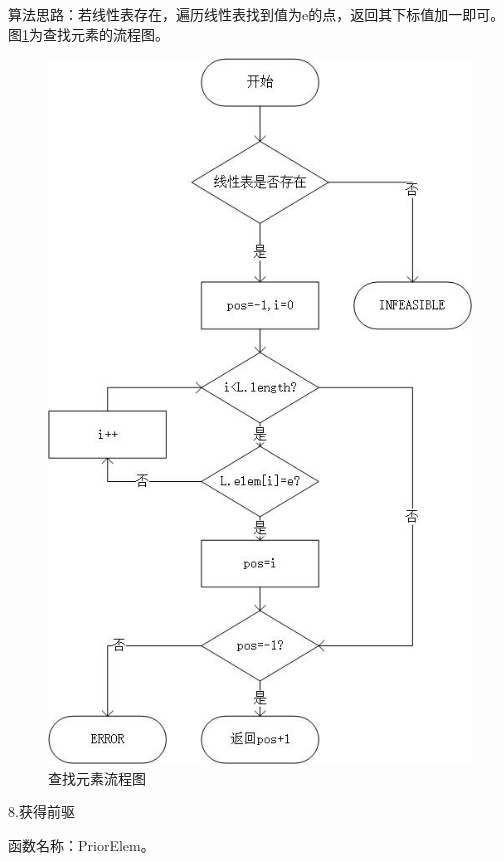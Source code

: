 \documentclass[supercite]{Experimental_Report}
\theoremstyle{definition}
\begin{document}
算法思路：若线性表存在，遍历线性表找到值为e的点，返回其下标值加一即可。图\ref{fig1-7}为查找元素的流程图。
\begin{figure}[htb] %
	\begin{center}
		\includegraphics[scale=0.9]{./images/顺序表/locate.jpg}
		\caption{查找元素流程图}
		\label{fig1-7}
	\end{center}
\end{figure}

\newpage

8.获得前驱

函数名称：PriorElem。
\end{document}
